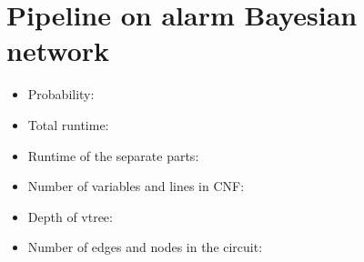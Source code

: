 \section{Pipeline on alarm Bayesian network}
\begin{itemize}
    \item Probability:
    \item Total runtime:
    \item Runtime of the separate parts:
    \item Number of variables and lines in CNF:
    \item Depth of vtree:
    \item Number of edges and nodes in the circuit:
\end{itemize}